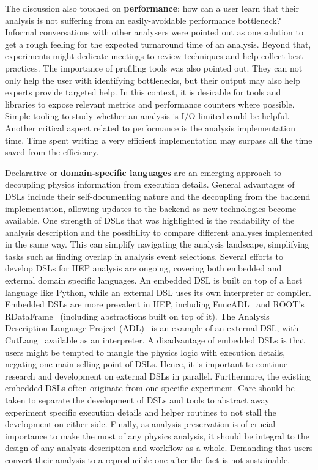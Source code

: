 \documentclass[a4paper,11pt]{article}
\begin{document}
The discussion also touched on \textbf{performance}: how can a user
learn that their analysis is not suffering from an easily-avoidable
performance bottleneck? Informal conversations with other analysers were
pointed out as one solution to get a rough feeling for the expected
turnaround time of an analysis. Beyond that, experiments might dedicate
meetings to review techniques and help collect best practices. The
importance of profiling tools was also pointed out. They can not only
help the user with identifying bottlenecks, but their output may also
help experts provide targeted help. In this context, it is desirable for
tools and libraries to expose relevant metrics and performance counters
where possible. Simple tooling to study whether an analysis is
I/O-limited could be helpful. Another critical aspect related to
performance is the analysis implementation time. Time spent writing a
very efficient implementation may surpass all the time saved from the
efficiency.

Declarative or \textbf{domain-specific languages} are an emerging
approach to decoupling physics information from execution details.
General advantages of DSLs include their self-documenting nature and the
decoupling from the backend implementation, allowing updates to the
backend as new technologies become available. One strength of DSLs that
was highlighted is the readability of the analysis description and the
possibility to compare different analyses implemented in the same way.
This can simplify navigating the analysis landscape, simplifying tasks
such as finding overlap in analysis event selections. Several efforts to
develop DSLs for HEP analysis are ongoing, covering both embedded and
external domain specific languages. An embedded DSL is built on top of a
host language like Python, while an external DSL uses its own
interpreter or compiler. Embedded DSLs are more prevalent in HEP,
including FuncADL~\cite{Proffitt:2021wfh} and ROOT's
RDataFrame~\cite{rdataframe} (including abstractions built on top of it). The
Analysis Description
Language Project (ADL)~\cite{adl-project,Sekmen:2020vph} is an example of an external DSL, with
CutLang~\cite{Sekmen:2018ehb} available as an
interpreter. A disadvantage of embedded DSLs is that users might be
tempted to mangle the physics logic with execution details, negating one
main selling point of DSLs. Hence, it is important to continue research
and development on external DSLs in parallel. Furthermore, the existing
embedded DSLs often originate from one specific experiment. Care should
be taken to separate the development of DSLs and tools to abstract away
experiment specific execution details and helper routines to not stall
the development on either side. Finally, as analysis preservation is of
crucial importance to make the most of any physics analysis, it should
be integral to the design of any analysis description and workflow as a
whole. Demanding that users convert their analysis to a reproducible one
after-the-fact is not sustainable.
\end{document}
